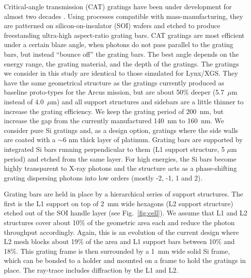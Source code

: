 \documentclass[12pt]{spieman}  %
\begin{document}
\begin{spacing}{1}
\label{sect:CAT}
Critical-angle transmission (CAT) gratings have been under development for almost two decades \cite{doi:10.1116/1.2779048,doi:10.1117/12.739941,doi:10.1116/1.2968613,doi:10.1116/1.3507427,doi:10.1116/1.4755815,doi:10.1117/12.2024357,doi:10.1116/1.4820901,doi:10.1116/1.4966595}.
Using processes compatible with mass-manufacturing, they are patterned on silicon-on-insulator (SOI) wafers and etched \cite{Heilmann:11,doi:10.1117/12.2188525} to produce freestanding ultra-high aspect-ratio grating bars. CAT gratings are most efficient under a certain blaze angle, when photons do not pass parallel to the grating bars, but instead ``bounce off'' the grating bars. The best angle depends on the energy range, the grating material, and the depth of the gratings.
The gratings we consider in this study are identical to those simulated for Lynx/XGS\cite{10.1117/1.JATIS.5.2.021003}. They have the same geometrical structure as the gratings currently produced as baseline proto-types for the Arcus mission, but are about 50\% deeper (5.7~$\mu$m instead of 4.0~$\mu$m) and all support structures and sidebars are a little thinner to increase the grating efficiency. We keep the grating period of 200~nm, but increase the gap from the currently manufactured 140~nm to 160~nm. We consider pure Si gratings and, as a design option, gratings where the side walls are coated with a $\sim 6$ nm thick layer of platinum. Grating bars are supported by integrated Si bars running perpendicular to them (L1 support structure, 5 $\mu$m period) and etched from the same layer.
For high energies, the Si bars become highly transparent to X-ray photons and the structure acts as a phase-shifting grating dispersing photons into low orders (mostly -2, -1, 1 and 2).

Grating bars are held in place by a hierarchical series of support structures. The first is the
L1 support on top of 2~mm wide hexagons (L2 support
structure) etched out of the SOI handle layer (see Fig.~\ref{fig:cell}).  We assume that L1 and L2 structures cover about 10\% of the geometric area
each and reduce the photon throughput accordingly. Again, this is an evolution of the current design where L2 mesh blocks about 19\% of the area and L1 support bars between 10\% and 18\%. This grating frame is then surrounded by a 1~mm wide solid Si frame, which can be bonded to a holder and mounted on a frame to hold the gratings in place.
The ray-trace includes diffraction by the L1 and L2\cite{10.1117/12.2525814}.


\end{spacing}
\end{document}

